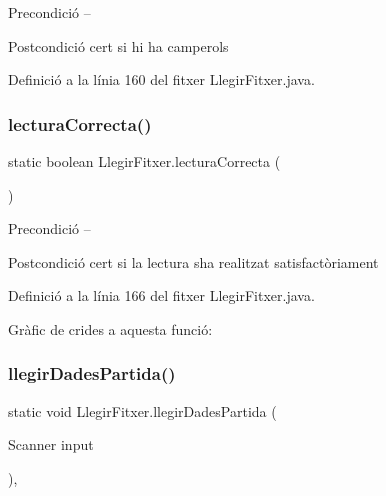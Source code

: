 \begin{DoxyPrecond}{Precondició}
-- 
\end{DoxyPrecond}
\begin{DoxyPostcond}{Postcondició}
cert si hi ha camperols 
\end{DoxyPostcond}


Definició a la línia 160 del fitxer Llegir\+Fitxer.\+java.

\mbox{\label{class_llegir_fitxer_a3e7c849571e7eeff4b0f9efc2f70b5ac}} 
\subsubsection{\texorpdfstring{lectura\+Correcta()}{lecturaCorrecta()}}
{\footnotesize\ttfamily static boolean Llegir\+Fitxer.\+lectura\+Correcta (\begin{DoxyParamCaption}{ }\end{DoxyParamCaption})\hspace{0.3cm}{\ttfamily [static]}}

\begin{DoxyPrecond}{Precondició}
-- 
\end{DoxyPrecond}
\begin{DoxyPostcond}{Postcondició}
cert si la lectura s\textquotesingle{}ha realitzat satisfactòriament 
\end{DoxyPostcond}


Definició a la línia 166 del fitxer Llegir\+Fitxer.\+java.

Gràfic de crides a aquesta funció\+:
\mbox{\label{class_llegir_fitxer_adeec6b2bd6754481b94c815b82e5bbce}} 
\subsubsection{\texorpdfstring{llegir\+Dades\+Partida()}{llegirDadesPartida()}}
{\footnotesize\ttfamily static void Llegir\+Fitxer.\+llegir\+Dades\+Partida (\begin{DoxyParamCaption}\item[{Scanner}]{input }\end{DoxyParamCaption})\hspace{0.3cm}{\ttfamily [static]}, {\ttfamily [private]}}

